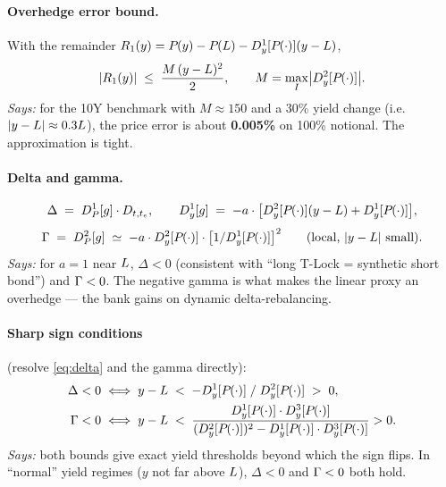 \documentclass[11pt,a4paper]{article}
\begin{document}
\paragraph{Overhedge error bound.}
With the remainder $R_1(y) = P_{}(y) - P_{}(L) - D_{y}^{1}[P_{}(\cdot)](y-L)$,
\begin{equation}\label{eq:overhedge}
  \lvert R_1(y) \rvert \;\le\; \frac{M\,(y-L)^2}{2},
  \qquad M = \max_I \bigl|D_{y}^{2}[P_{}(\cdot)]\bigr|.
\end{equation}
\textit{Says:} for the 10Y benchmark with $M \approx 150$ and a 30\%
yield change (i.e.\ $|y-L| \approx 0.3L$), the price error is
about \textbf{0.005\%} on 100\% notional. The approximation is tight.

\paragraph{Delta and gamma.}
\begin{equation}\label{eq:delta}
  \Delta \;=\; D_{P}^{1}[g] \cdot D_{t,t_e}, \qquad
  D_{y}^{1}[g] \;=\; -a \cdot \bigl[D_{y}^{2}[P_{}(\cdot)](y-L) + D_{y}^{1}[P_{}(\cdot)]\bigr],
\end{equation}
\begin{equation}\label{eq:gamma-local}
  \Gamma \;=\; D_{P}^{2}[g] \;\simeq\; -a \cdot D_{y}^{2}[P_{}(\cdot)] \cdot \bigl[1/D_{y}^{1}[P_{}(\cdot)]\bigr]^2
  \qquad \text{(local, } |y-L| \text{ small)}.
\end{equation}
\textit{Says:} for $a=1$ near $L$, $\Delta < 0$ (consistent with
``long T-Lock = synthetic short bond'') and $\Gamma < 0$. The negative
gamma is what makes the linear proxy an overhedge --- the bank gains
on dynamic delta-rebalancing.

\paragraph{Sharp sign conditions} (resolve \eqref{eq:delta} and the gamma directly):
\begin{align}
  \Delta < 0 &\iff y - L \;<\; -D_{y}^{1}[P_{}(\cdot)] \;/\; D_{y}^{2}[P_{}(\cdot)] \;>\; 0, \label{eq:delta-cond}\\
  \Gamma   < 0 &\iff y - L \;<\; \frac{D_{y}^{1}[P_{}(\cdot)] \cdot D_{y}^{3}[P_{}(\cdot)]}{(D_{y}^{2}[P_{}(\cdot)])^2 - D_{y}^{1}[P_{}(\cdot)] \cdot D_{y}^{3}[P_{}(\cdot)]} > 0. \label{eq:gamma-cond}
\end{align}
\textit{Says:} both bounds give exact yield thresholds beyond which
the sign flips. In ``normal'' yield regimes ($y$ not far above
$L$), $\Delta < 0$ and $\Gamma < 0$ both hold.
\end{document}
